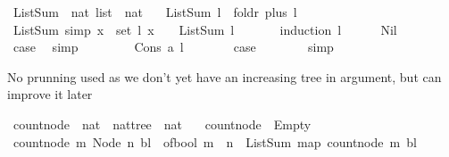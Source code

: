 \begin{isabellebody}
\ ListSum\ {\isacharcolon}{\isacharcolon}\ {\isachardoublequoteopen}nat\ list\ {\isasymRightarrow}\ nat{\isachardoublequoteclose}\ \isanewline
\ \ {\isachardoublequoteopen}ListSum\ l\ {\isacharequal}\ foldr\ plus\ l\ {}{\isachardoublequoteclose}\isanewline
\isanewline
{}\isamarkupfalse%
\ ListSum{\isacharunderscore}{}\ {\isacharbrackleft}simp{\isacharbrackright}\ {\isacharcolon}{\isachardoublequoteopen}{\isacharparenleft}{\isasymforall}x\ {\isasymin}\ set\ l{\isachardot}\ x\ {\isacharequal}\ {}{\isacharparenright}\ {\isasymlongrightarrow}\ ListSum\ l\ {\isacharequal}\ {}{\isachardoublequoteclose}\ \isanewline
%
\isadelimproof
\ \ %
\endisadelimproof
%
\isatagproof
{}\isamarkupfalse%
\ {\isacharparenleft}induction\ l{\isacharparenright}\isanewline
\ \ \ \ \isamarkupfalse%
\ Nil\isanewline
\ \ \ \ \isamarkupfalse%
\ \isamarkupfalse%
\ {\isacharquery}case\ \isamarkupfalse%
\ simp\isanewline
\ \ \isamarkupfalse%
\isanewline
\ \ \ \ \isamarkupfalse%
\ {\isacharparenleft}Cons\ a\ l{\isacharparenright}\isanewline
\ \ \ \ \isamarkupfalse%
\ \isamarkupfalse%
\ {\isacharquery}case\isanewline
\ \ \ \ \ \ \isamarkupfalse%
\ simp\ \isanewline
\ \ \isamarkupfalse%
%
\endisatagproof
{\isafoldproof}%
%
\isadelimproof
%
\endisadelimproof
%
\begin{isamarkuptext}%
No prunning used as we don't yet have an increasing tree in argument, but can improve it later%
\end{isamarkuptext}\isamarkuptrue%
\isamarkupfalse%
\ count{\isacharunderscore}node\ {\isacharcolon}{\isacharcolon}\ {\isachardoublequoteopen}nat\ {\isasymRightarrow}\ nattree\ {\isasymRightarrow}\ nat{\isachardoublequoteclose}\ \isanewline
\ \ {\isachardoublequoteopen}count{\isacharunderscore}node\ {\isacharunderscore}\ Empty\ {\isacharequal}\ {}{\isachardoublequoteclose}\isanewline
{\isacharbar}\ {\isachardoublequoteopen}count{\isacharunderscore}node\ m\ {\isacharparenleft}Node\ n\ bl{\isacharparenright}\ {\isacharequal}\ {\isacharparenleft}of{\isacharunderscore}bool\ {\isacharparenleft}m\ {\isacharequal}\ n{\isacharparenright}{\isacharparenright}\ {\isacharplus}\ ListSum\ {\isacharparenleft}map\ {\isacharparenleft}count{\isacharunderscore}node\ m{\isacharparenright}\ bl{\isacharparenright}{\isachardoublequoteclose}\isanewline
\isanewline

\end{isabellebody}

